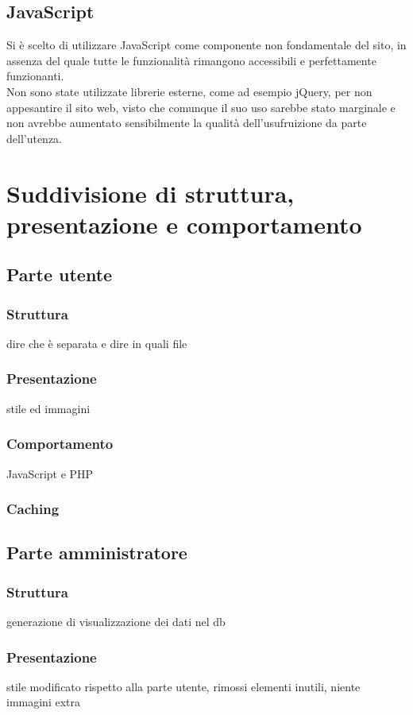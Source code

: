 \documentclass[openany, a4paper, 12pt]{report}
\begin{document}
	\subsection{JavaScript}
	Si è scelto di utilizzare JavaScript come componente non fondamentale del sito, in assenza del quale tutte le funzionalità rimangono accessibili e perfettamente funzionanti.\\
	Non sono state utilizzate librerie esterne, come ad esempio jQuery, per non appesantire il sito web, visto che comunque il suo uso sarebbe stato marginale e non avrebbe aumentato sensibilmente la qualità dell'usufruizione da parte dell'utenza.
	
	\section{Suddivisione di struttura, presentazione e comportamento}
	\subsection{Parte utente}
	\subsubsection{Struttura}
	dire che è separata e dire in quali file
	\subsubsection{Presentazione}
	stile ed immagini
	\subsubsection{Comportamento}
	JavaScript e PHP
	\subsubsection{Caching}
	
	\subsection{Parte amministratore}
	\subsubsection{Struttura}
	generazione di visualizzazione dei dati nel db
	\subsubsection{Presentazione}
	stile modificato rispetto alla parte utente, rimossi elementi inutili, niente immagini extra
\end{document}
